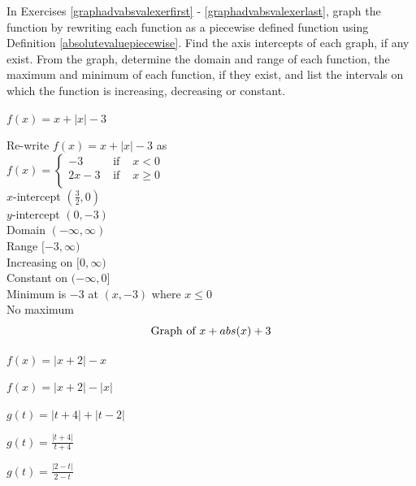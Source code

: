 \documentclass{ximera}
\begin{document}
\begin{question}
In Exercises \ref{graphadvabsvalexerfirst} - \ref{graphadvabsvalexerlast}, graph the function by rewriting each function as a piecewise defined function using Definition \ref{absolutevaluepiecewise}. Find the axis intercepts of each graph, if any exist.  From the graph, determine the domain and range of each function, the maximum and minimum of each function, if they exist, and list the intervals on which the function is increasing, decreasing or constant.

\begin{problem}\label{graphadvabsvalexerfirst}
$f(x) = x + |x| - 3$  

\begin{solution}
Re-write $f(x) = x+|x| - 3$ as \\ ${\displaystyle f(x) = \left\{ \begin{array}{rcl}
-3 & \mbox{ if } & x < 0\\
     2x -3 & \mbox{ if } & x \geq 0 \\ \end{array} \right. }$ \\  $x$-intercept $\left(\frac{3}{2}, 0\right)$ \\ $y$-intercept $(0,-3)$ \\ Domain $(-\infty, \infty)$ \\ Range $[-3, \infty)$ \\ Increasing on $[0,\infty)$ \\ Constant on $(-\infty, 0]$ \\  Minimum is $-3$ at $(x,-3)$ where $x \leq 0$ \\ No  maximum  \\

$$\text{Graph of $x+abs(x)+3$}$$
\end{solution}
\end{problem}

\begin{problem}
$f(x) = |x+2| - x$
\end{problem}

\begin{problem}
$f(x) = |x+2| - |x|$
\end{problem}

\begin{problem}
$g(t) = |t+ 4| + |t- 2|$
\end{problem}

\begin{problem}
$g(t) = \frac{|t + 4|}{t + 4}$
\end{problem}

\begin{problem}\label{graphadvabsvalexerlast}
$g(t) = \frac{|2 - t|}{2 - t}$
\end{problem}
  

\end{question}
\end{document}
